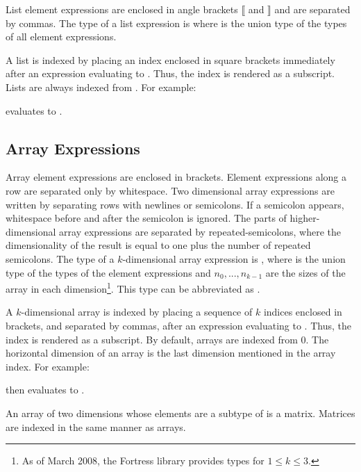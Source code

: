 List element expressions are enclosed in
angle brackets $\llbracket$ and $\rrbracket$ and are separated by commas.
The type of a list expression is 
 where 
is the union type of the types of all element expressions.

A list  is indexed by placing an index enclosed in square brackets
immediately after an expression evaluating to .
Thus, the index is rendered as a subscript.
Lists are always indexed from .
For example:

evaluates to .


\subsection{Array Expressions}

Array element expressions are enclosed in brackets. Element expressions
along a row are separated only by whitespace.
Two dimensional array expressions are written by separating rows with
newlines or semicolons.  If a semicolon appears, whitespace before
and after the semicolon is ignored.
The parts of higher-dimensional array expressions are separated
by repeated-semicolons, where the dimensionality
of the result is equal to one plus the number
of repeated semicolons.
The type of a $k$-dimensional array expression is
,
where  is the union type of the types of the element expressions and
$n_0, ..., n_{k-1}$
are the sizes of the array in each dimension\footnote{
As of March 2008, the Fortress library provides  types for
$1 \le k \le 3$.}. This type can be abbreviated as
.




A $k$-dimensional array  is indexed by placing a sequence of
$k$ indices enclosed in brackets, and separated by commas, after an expression
evaluating to .
Thus, the index is rendered as a subscript.
By default, arrays are indexed from 0.  The
horizontal dimension of an array is the last dimension mentioned in the
array index.  For example:

then  evaluates to .

An array of two
dimensions whose elements are a subtype of 
is a matrix.
Matrices are indexed in the same manner as arrays.

